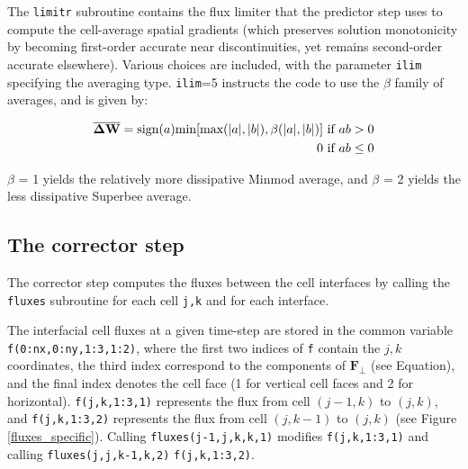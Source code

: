 \documentclass{article}
\newcommand{\code}[1]{\texttt{#1}}
\begin{document}
The \code{limitr} subroutine contains the flux limiter that the predictor step uses to compute the cell-average spatial gradients (which preserves solution monotonicity by becoming first-order accurate near discontinuities, yet remains second-order accurate elsewhere).
Various choices are included, with the parameter \code{ilim} specifying the averaging type. \code{ilim}=5 instructs the code to use the $\beta$ family of averages, and is given by:

\begin{eqnarray*}
	\mathbf{\overline{\Delta W}} = \text{sign}(a)\text{min}[\text{max}(|a|, |b|), \beta(|a|, |b|)]  \textmd{ if }  ab>0  \\ 
	0 \textmd{ if }  ab \leq 0	
\end{eqnarray*}

$\beta$ = 1 yields the relatively more dissipative Minmod average, and $\beta $ = 2 yields the less dissipative Superbee average. 


\subsection{The corrector step}

The corrector step computes the fluxes between the cell interfaces by calling the \code{fluxes} subroutine for each cell \code{j,k} and for each interface. 

The interfacial cell fluxes at a given time-step are stored in the common variable \code{f(0:nx,0:ny,1:3,1:2)}, where the first two indices of \code{f} contain the $j,k$ coordinates, the third index correspond to the components of  $\mathbf{F_\perp}$ (see Equation), and the final index denotes the cell face (1 for vertical cell faces and 2 for horizontal).   
\code{f(j,k,1:3,1)} represents the flux from cell $(j-1, k)$ to $(j, k)$, and
\code{f(j,k,1:3,2)} represents the flux from cell $(j, k-1)$ to $(j, k)$ (see Figure \ref{fluxes_specific}).
Calling \code{fluxes(j-1,j,k,k,1)} modifies \code{f(j,k,1:3,1)}  and calling \code{fluxes(j,j,k-1,k,2)} \code{f(j,k,1:3,2)}.
\end{document}
